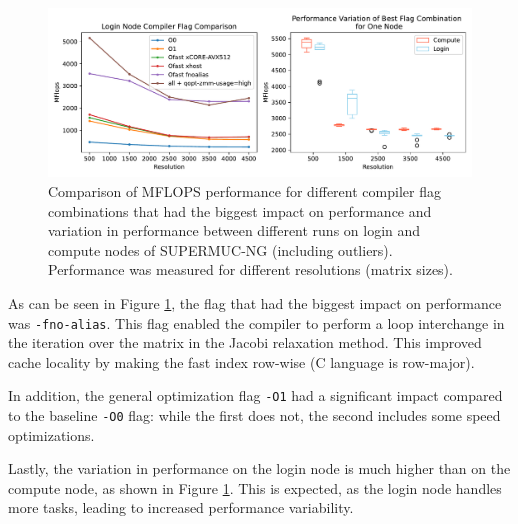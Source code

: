 \begin{figure}[H]
    \centering
    \includegraphics[width=\textwidth]{figures/group2_perf.pdf}
    \caption{Comparison of MFLOPS performance for different compiler flag combinations that had the biggest impact on performance and variation in performance between different runs on login and compute nodes of SUPERMUC-NG (including outliers). Performance was measured for different resolutions (matrix sizes).}
    \label{fig:compiler_flags}
\end{figure}

As can be seen in Figure \ref{fig:compiler_flags}, the flag that had the biggest impact on performance was \texttt{-fno-alias}. This flag enabled the compiler to perform a loop interchange in the iteration over the matrix in the Jacobi relaxation method. This improved cache locality by making the fast index row-wise (C language is row-major).

In addition, the general optimization flag \texttt{-O1} had a significant impact compared to the baseline \texttt{-O0} flag: while the first does not, the second includes some speed optimizations.

Lastly, the variation in performance on the login node is much higher than on the compute node, as shown in Figure \ref{fig:compiler_flags}. This is expected, as the login node handles more tasks, leading to increased performance variability.